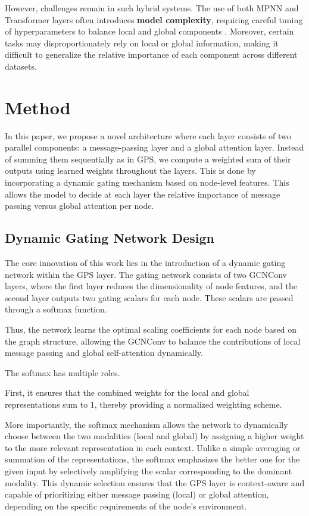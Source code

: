\documentclass{acmart}
\begin{document}
However, challenges remain in such hybrid systems. The use of both MPNN and Transformer layers often introduces \textbf{model complexity}, requiring careful tuning of hyperparameters to balance local and global components \cite{Rampasek2022}. Moreover, certain tasks may disproportionately rely on local or global information, making it difficult to generalize the relative importance of each component across different datasets.

\section{Method}

In this paper, we propose a novel architecture where each layer consists of two parallel components: a message-passing layer and a global attention layer. Instead of summing them sequentially as in GPS, we compute a weighted sum of their outputs using learned weights throughout the layers. This is done by incorporating a dynamic gating mechanism based on node-level features. This allows the model to decide at each layer the relative importance of message passing versus global attention per node.

\subsection{Dynamic Gating Network Design}

The core innovation of this work lies in the introduction of a dynamic gating network within the GPS layer. The gating network consists of two GCNConv layers, where the first layer reduces the dimensionality of node features, and the second layer outputs two gating scalars for each node. These scalars are passed through a softmax function.

Thus, the network learns the optimal scaling coefficients for each node based on the graph structure, allowing the GCNConv to balance the contributions of local message passing and global self-attention dynamically.

The softmax has multiple roles. 

First, it ensures that the combined weights for the local and global representations sum to 1, thereby providing a normalized weighting scheme. 

More importantly, the softmax mechanism allows the network to dynamically choose between the two modalities (local and global) by assigning a higher weight to the more relevant representation in each context. Unlike a simple averaging or summation of the representations, the softmax emphasizes the better one for the given input by selectively amplifying the scalar corresponding to the dominant modality. This dynamic selection ensures that the GPS layer is context-aware and capable of prioritizing either message passing (local) or global attention, depending on the specific requirements of the node’s environment.
\end{document}
